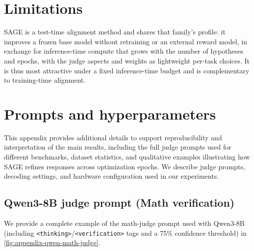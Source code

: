 \documentclass[letterpaper]{article} %
\newcommand{\method}{SAGE}
\begin{document}
\section*{Limitations}
\noindent \textcolor{orange!85!black}{\method{} is a test-time alignment method and shares that family's profile: it improves a frozen base model without retraining or an external reward model, in exchange for inference-time compute that grows with the number of hypotheses and epochs, with the judge aspects and weights as lightweight per-task choices. It is thus most attractive under a fixed inference-time budget and is complementary to training-time alignment.}




\appendix

\section{Prompts and hyperparameters}\label{sec:prompts-and-hyperparameters}
This appendix provides additional details to support reproducibility and interpretation of the main results, including the full judge prompts used for different benchmarks, dataset statistics, and qualitative examples illustrating how \method{} refines responses across optimization epochs. We describe judge prompts, decoding settings, and hardware configuration used in our experiments.

\subsection{Qwen3-8B judge prompt (Math verification)}
We provide a complete example of the math-judge prompt used with Qwen3-8B (including \texttt{<thinking>}/\texttt{<verification>} tags and a 75\% confidence threshold) in \cref{fig:appendix-qwen-math-judge}.
\end{document}

